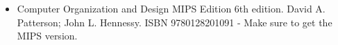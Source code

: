\begin{itemize}
    \item Computer Organization and Design MIPS Edition 6th edition. David A. Patterson; John L. Hennessy. ISBN 9780128201091 - Make sure to get the MIPS version.
\end{itemize}
